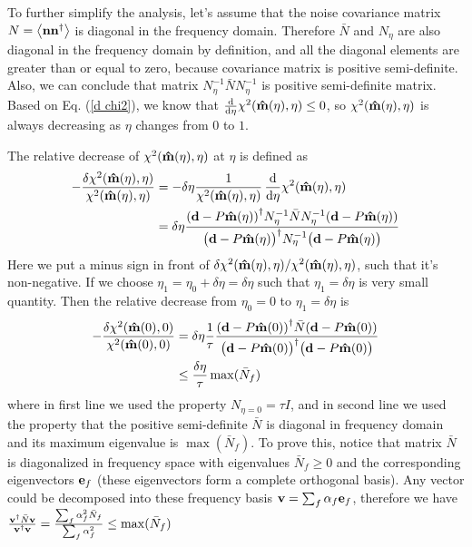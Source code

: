\documentclass[11pt, letterpaper]{article}
\newcommand{\vbd}{\vb{d}}
\newcommand{\vbn}{\vb{n}}
\newcommand{\inv}[1]{#1^{-1}}
\newcommand{\hatm}{\vb{\hat{m}}}
\newcommand{\Nbar}{\bar{N}}
\newcommand{\Neta}{N_{\eta}}
\begin{document}
To further simplify the analysis, let's assume that the noise covariance matrix
$N = \ev{\vbn\vbn^{\dagger}}$ is diagonal in the frequency domain.
Therefore $\Nbar$ and $\Neta$ are also diagonal in the frequency domain by
definition, and all the diagonal elements are greater than or equal to zero,
because covariance matrix is positive semi-definite.
Also, we can conclude that matrix
$\inv{\Neta} \Nbar \inv{\Neta}$ is positive semi-definite matrix.
Based on Eq. (\ref{d chi2}), we know that
$\dv{\eta} \chi^2({\hatm(\eta), \eta}) \leq 0$,
so $\chi^2(\hatm(\eta), \eta)$ is always decreasing
as $\eta$ changes from $0$ to $1$.

The relative decrease of $\chi^2(\hatm(\eta), \eta)$ at $\eta$ is defined as
\begin{align}
\begin{aligned}[b]
-\frac{\delta \chi^2(\hatm(\eta),\eta)} {\chi^2(\hatm(\eta), \eta)}
&=
-\delta \eta \frac{1}{\chi^2(\hatm(\eta), \eta)} \, 
\dv{\eta} \chi^2(\hatm(\eta), \eta) 
\\&= 
\delta \eta 
\frac{\qty(\vbd - P\hatm(\eta))^{\dagger}
    \inv{\Neta} \Nbar \inv{\Neta}
    (\vbd - P\hatm(\eta)) 
}
{\qty\big(\vbd - P \hatm(\eta))^{\dagger} 
    \inv{\Neta}
    \qty\big(\vbd - P\hatm(\eta))
}
\end{aligned}
\end{align}
Here we put a minus sign in front of
$\delta\chi^2(\hatm(\eta), \eta)/\chi^2(\hatm(\eta), \eta)$,
such that it's non-negative.
If we choose $\eta_1 = \eta_0 + \delta\eta = \delta\eta$
such that $\eta_1 = \delta \eta$ is very small quantity.
Then the relative decrease from $\eta_0= 0$ to $\eta_1 = \delta \eta$ is
\begin{align}
\begin{aligned}[b]
-\frac{\delta \chi^2(\hatm(0), 0)}{\chi^2(\hatm(0), 0)} 
&= \delta \eta 
\frac{1}{\tau}
\frac{\qty(\vbd - P\hatm(0))^{\dagger} \Nbar  (\vbd - P\hatm(0)) }
    {\qty\big(\vbd - P \hatm(0))^{\dagger} \qty\big(\vbd - P\hatm(0))}
\\
& \leq  \frac{\delta \eta}{\tau} \max(\Nbar_f)
\end{aligned}
\end{align}
where in first line we used the property $N_{\eta=0} = \tau I$,
and in second line we used the property that the positive semi-definite $\Nbar$ is diagonal in frequency 
domain and its maximum eigenvalue is $\max(\Nbar_f)$.
To prove this, notice that matrix $\Nbar$ is diagonalized in frequency space 
with eigenvalues $\Nbar_f\geq0$ and the corresponding eigenvectors $\vb{e}_f$
(these eigenvectors form a complete orthogonal basis).
Any vector could be decomposed into these frequency basis
$\vb{v} = \sum_f \alpha_f \vb{e}_f$, therefore we have
$\frac{\vb{v}^{\dagger} \Nbar \vb{v}}{\vb{v}^{\dagger} \vb{v}} 
= \frac{\sum_f \alpha_f^2\Nbar_f}{\sum_f \alpha_f^2}
\leq \max(\Nbar_f) $
\end{document}
